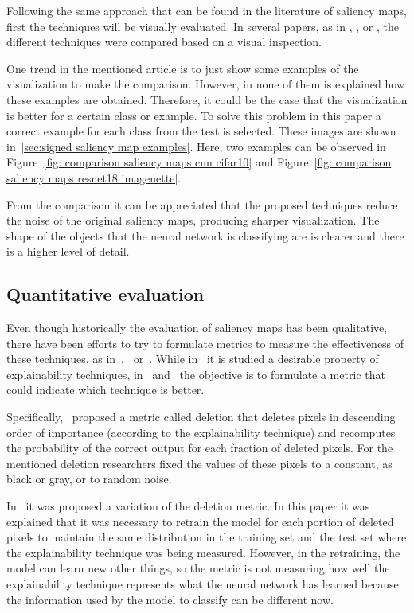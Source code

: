 \documentclass[preprint,12pt]{elsarticle}
\begin{document}
Following the same approach that can be found in the literature of saliency maps, first the techniques will be visually evaluated. In several papers, as in \cite{Simonyan2014}, \cite{Springenberg2015}, \cite{Smilkov2017} or \cite{Sundararajan2017}, the different techniques were compared based on a visual inspection. 

One trend in the mentioned article is to just show some examples of the visualization to make the comparison. However, in none of them is explained how these examples are obtained. Therefore, it could be the case that the visualization is better for a certain class or example. To solve this problem in this paper a correct example for each class from the test is selected. These images are shown in~\ref{sec:signed saliency map examples}. Here, two examples can be observed in Figure~\ref{fig: comparison saliency maps cnn cifar10} and Figure~\ref{fig: comparison saliency maps resnet18 imagenette}.

From the comparison it can be appreciated that the proposed techniques reduce the noise of the original saliency maps, producing sharper visualization. The shape of the objects that the neural network is classifying are is clearer and there is a higher level of detail.

\subsection{Quantitative evaluation}

Even though historically the evaluation of saliency maps has been qualitative, there have been efforts to try to formulate metrics to measure the effectiveness of these techniques, as in~\cite{Petsiuk2018},~\cite{Hooker2019} or~\cite{Ancona2018}. While in~\cite{Ancona2018} it is studied a desirable property of explainability techniques, in~\cite{Petsiuk2018} and~\cite{Hooker2019} the objective is to formulate a metric that could indicate which technique is better. 

Specifically,~\cite{Petsiuk2018} proposed a metric called deletion that deletes pixels in descending order of importance (according to the explainability technique) and recomputes the probability of the correct output for each fraction of deleted pixels. For the mentioned deletion researchers fixed the values of these pixels to a constant, as black or gray, or to random noise. 

In~\cite{Hooker2019} it was proposed a variation of the deletion metric. In this paper it was explained that it was necessary to retrain the model for each portion of deleted pixels to maintain the same distribution in the training set and the test set where the explainability technique was being measured. However, in the retraining, the model can learn new other things, so the metric is not measuring how well the explainability technique represents what the neural network has learned because the information used by the model to classify can be different now.
\end{document}
